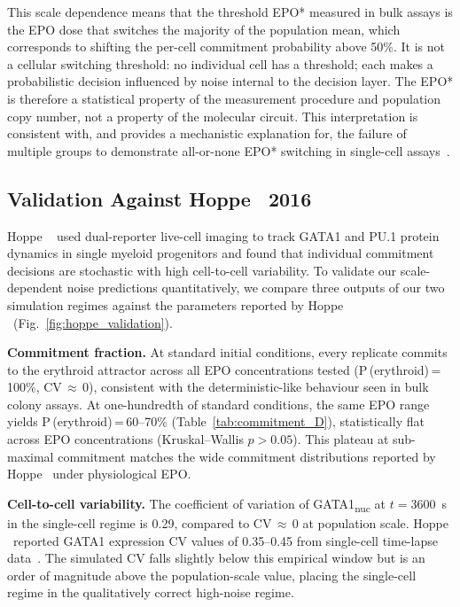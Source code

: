 This scale dependence means that the threshold EPO* measured in bulk assays is
the EPO dose that switches the majority of the population mean, which corresponds
to shifting the per-cell commitment probability above 50\%. It is not a cellular
switching threshold: no individual cell has a threshold; each makes a
probabilistic decision influenced by noise internal to the decision layer. The
EPO* is therefore a statistical property of the measurement procedure and
population copy number, not a property of the molecular circuit. This
interpretation is consistent with, and provides a mechanistic explanation for,
the failure of multiple groups to demonstrate all-or-none EPO* switching in
single-cell assays~\cite{hoppe2016,olsson2016}.

\subsection{Validation Against Hoppe \etal\ 2016}
\label{sec:hoppe}

Hoppe \etal~\cite{hoppe2016} used dual-reporter live-cell imaging to track GATA1
and PU.1 protein dynamics in single myeloid progenitors and found that individual
commitment decisions are stochastic with high cell-to-cell variability. To
validate our scale-dependent noise predictions quantitatively, we compare three
outputs of our two simulation regimes against the parameters reported by Hoppe
\etal\ (Fig.~\ref{fig:hoppe_validation}).

\textbf{Commitment fraction.}
At standard initial conditions, every replicate commits to the erythroid
attractor across all EPO concentrations tested (P\,(erythroid)\,=\,100\%,
CV\,$\approx$\,0), consistent with the deterministic-like behaviour seen in
bulk colony assays. At one-hundredth of standard conditions, the same EPO range
yields P\,(erythroid)\,=\,60--70\% (Table~\ref{tab:commitment_D}), statistically
flat across EPO concentrations (Kruskal--Wallis $p>0.05$). This plateau at
sub-maximal commitment matches the wide commitment distributions reported by
Hoppe \etal\ under physiological EPO.

\textbf{Cell-to-cell variability.}
The coefficient of variation of GATA1\textsubscript{nuc} at $t=3600$~s in the
single-cell regime is 0.29, compared to CV\,$\approx$\,0 at population scale.
Hoppe \etal\ reported GATA1 expression CV values of 0.35--0.45 from single-cell
time-lapse data~\cite{hoppe2016}. The simulated CV falls slightly below this
empirical window but is an order of magnitude above the population-scale value,
placing the single-cell regime in the qualitatively correct high-noise
regime.

